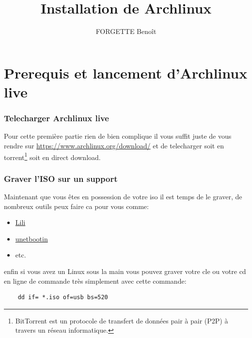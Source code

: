 \documentclass[a4paper]{book}
\begin{document}
  \title{Installation de Archlinux}
  \author{FORGETTE Benoît}
  \maketitle


  \tableofcontents
  \part{Prerequis et lancement d'Archlinux live}
  \section{Telecharger Archlinux live}
  Pour cette première partie rien de bien complique il vous suffit juste de
  vous rendre sur \url{https://www.archlinux.org/download/} et de telecharger
  soit en torrent\footnote{BitTorrent est un protocole de transfert de données 
  pair à pair (P2P) à travers un réseau informatique.}
  soit en direct download.
  \section{Graver l'ISO sur un support}
  Maintenant que vous êtes en possession de votre iso il est temps de le
  graver, de nombreux outils peux faire ca pour vous comme\@:
  \begin{itemize} 
    \item \href{http://www.linuxliveusb.com/fr/download}{Lili}
    \item \href{https://unetbootin.github.io/}{unetbootin}
    \item etc.
  \end{itemize}
  enfin si vous avez un Linux sous la main vous pouvez graver votre cle ou
  votre cd en ligne de commande très simplement avec cette commande\@:\\
  \begin{lstlisting}
    dd if= *.iso of=usb bs=520
  \end{lstlisting}
\end{document}
